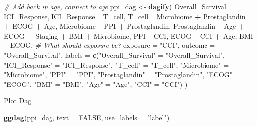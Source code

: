 \documentclass[
]{article}
\newenvironment{Shaded}{\begin{snugshade}}{\end{snugshade}}
\newcommand{\CommentTok}[1]{\textcolor[rgb]{0.56,0.35,0.01}{\textit{#1}}}
\newcommand{\DataTypeTok}[1]{\textcolor[rgb]{0.13,0.29,0.53}{#1}}
\newcommand{\KeywordTok}[1]{\textcolor[rgb]{0.13,0.29,0.53}{\textbf{#1}}}
\newcommand{\NormalTok}[1]{#1}
\newcommand{\OperatorTok}[1]{\textcolor[rgb]{0.81,0.36,0.00}{\textbf{#1}}}
\newcommand{\OtherTok}[1]{\textcolor[rgb]{0.56,0.35,0.01}{#1}}
\newcommand{\StringTok}[1]{\textcolor[rgb]{0.31,0.60,0.02}{#1}}
\begin{document}
\begin{Shaded}
\begin{Highlighting}[]
\CommentTok{# Add back in age, connect to age}
\NormalTok{ppi_dag <-}\StringTok{ }\KeywordTok{dagify}\NormalTok{(}
\NormalTok{   Overall_Survival }\OperatorTok{~}\StringTok{ }\NormalTok{ICI_Response,}
\NormalTok{   ICI_Response }\OperatorTok{~}\StringTok{ }\NormalTok{T_cell,}
\NormalTok{   T_cell }\OperatorTok{~}\StringTok{ }\NormalTok{Microbiome }\OperatorTok{+}\StringTok{ }\NormalTok{Prostaglandin }\OperatorTok{+}\StringTok{ }\NormalTok{ECOG }\OperatorTok{+}\StringTok{ }\NormalTok{Age,}
\NormalTok{   Microbiome }\OperatorTok{~}\StringTok{ }\NormalTok{PPI }\OperatorTok{+}\StringTok{ }\NormalTok{Prostaglandin,}
\NormalTok{   Prostaglandin }\OperatorTok{~}\StringTok{ }\NormalTok{Age }\OperatorTok{+}\StringTok{ }\NormalTok{ECOG }\OperatorTok{+}\StringTok{ }\NormalTok{Staging }\OperatorTok{+}\StringTok{ }\NormalTok{BMI }\OperatorTok{+}\StringTok{ }\NormalTok{Microbiome,}
\NormalTok{   PPI }\OperatorTok{~}\StringTok{ }\NormalTok{CCI,}
\NormalTok{   ECOG }\OperatorTok{~}\StringTok{ }\NormalTok{CCI }\OperatorTok{+}\StringTok{ }\NormalTok{Age,}
\NormalTok{   BMI }\OperatorTok{~}\StringTok{ }\NormalTok{ECOG,}
   \CommentTok{# What should exposure be?}
   \DataTypeTok{exposure =} \StringTok{"CCI"}\NormalTok{,}
   \DataTypeTok{outcome =} \StringTok{"Overall_Survival"}\NormalTok{, }
   \DataTypeTok{labels =} \KeywordTok{c}\NormalTok{(}\StringTok{"Overall_Survival"}\NormalTok{ =}\StringTok{ "Overall_Survival"}\NormalTok{,}
                   \StringTok{"ICI_Response"}\NormalTok{ =}\StringTok{ "ICI_Response"}\NormalTok{,}
                   \StringTok{"T_cell"}\NormalTok{ =}\StringTok{ "T_cell"}\NormalTok{,}
                   \StringTok{"Microbiome"}\NormalTok{ =}\StringTok{ "Microbiome"}\NormalTok{,}
                   \StringTok{"PPI"}\NormalTok{ =}\StringTok{ "PPI"}\NormalTok{,}
                   \StringTok{"Prostaglandin"}\NormalTok{ =}\StringTok{ "Prostaglandin"}\NormalTok{,}
                   \StringTok{"ECOG"}\NormalTok{ =}\StringTok{ "ECOG"}\NormalTok{,}
                   \StringTok{"BMI"}\NormalTok{ =}\StringTok{ "BMI"}\NormalTok{,}
              \StringTok{"Age"}\NormalTok{ =}\StringTok{ "Age"}\NormalTok{,}
              \StringTok{"CCI"}\NormalTok{ =}\StringTok{ "CCI"}\NormalTok{)}
\NormalTok{)}
\end{Highlighting}
\end{Shaded}

Plot Dag

\begin{Shaded}
\begin{Highlighting}[]
\KeywordTok{ggdag}\NormalTok{(ppi_dag,}
      \DataTypeTok{text =} \OtherTok{FALSE}\NormalTok{, }\DataTypeTok{use_labels =} \StringTok{"label"}\NormalTok{)}
\end{Highlighting}
\end{Shaded}
\end{document}
